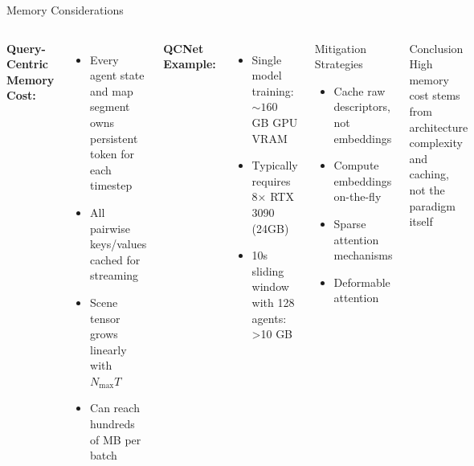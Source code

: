 \documentclass[10pt,aspectratio=169]{beamer}
\begin{document}
\begin{frame}{Memory Considerations}
\begin{columns}[T]
\textbf{Query-Centric Memory Cost:}
\begin{itemize}
    \item Every agent state and map segment owns persistent token for each timestep
    \item All pairwise keys/values cached for streaming
    \item Scene tensor grows linearly with $N_{\max}T$
    \item Can reach hundreds of MB per batch
\end{itemize}

\textbf{QCNet Example:}
\begin{itemize}
    \item Single model training: $\sim 160$ GB GPU VRAM
    \item Typically requires 8× RTX 3090 (24GB)
    \item 10s sliding window with 128 agents: >10 GB
\end{itemize}

\begin{block}{Mitigation Strategies}
\begin{itemize}
    \item Cache raw descriptors, not embeddings
    \item Compute embeddings on-the-fly
    \item Sparse attention mechanisms
    \item Deformable attention
\end{itemize}
\end{block}

\begin{alertblock}{Conclusion}
High memory cost stems from architecture complexity and caching, not the paradigm itself
\end{alertblock}
\end{columns}
\end{frame}
\end{document}
